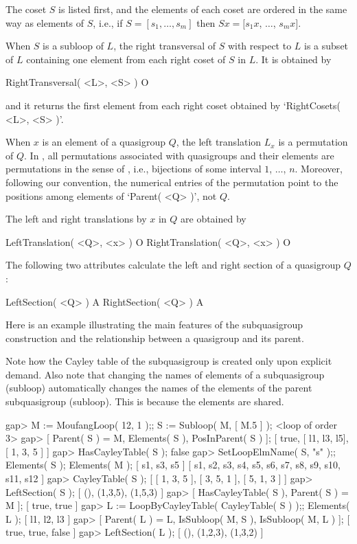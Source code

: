 The coset $S$ is listed first, and the elements of each coset are ordered in
the same way as elements of $S$, i.e., if $S = [s_1,\dots,s_m]$ then
$Sx=[s_1x$, $\dots$, $s_mx]$.

When $S$ is a subloop of $L$, the right transversal of $S$
with respect to $L$ is a subset of $L$ containing one element from each right
coset of $S$ in $L$. It is obtained by

\>RightTransversal( <L>, <S> ) O

and it returns the first element from each right coset obtained by
`RightCosets( <L>, <S> )'.


When $x$ is an element of a quasigroup $Q$, the left translation $L_x$ is a
permutation of $Q$. In {\LOOPS}, all permutations associated with quasigroups
and their elements are permutations in the sense of \GAP, i.e., bijections of
some interval $1$, $\dots$, $n$. Moreover, following our convention, the
numerical entries of the permutation point to the positions among elements of
`Parent( <Q> )', not $Q$.

The left and right translations by $x$ in $Q$ are obtained by

\>LeftTranslation( <Q>, <x> ) O
\>RightTranslation( <Q>, <x> ) O

The following two attributes calculate the left and right section of a
quasigroup $Q$:

\>LeftSection( <Q> ) A
\>RightSection( <Q> ) A

Here is an example illustrating the main features of the subquasigroup
construction and the relationship between a quasigroup and its parent.

Note how the Cayley table of the subquasigroup is created only upon explicit
demand. Also note that changing the names of elements of a subquasigroup
(subloop) automatically changes the names of the elements of the parent
subquasigroup (subloop). This is because the elements are shared.

\beginexample
gap> M := MoufangLoop( 12, 1 );; S := Subloop( M, [ M.5 ] );
<loop of order 3>
gap> [ Parent( S ) = M, Elements( S ), PosInParent( S ) ];
[ true, [ l1, l3, l5], [ 1, 3, 5 ] ]
gap> HasCayleyTable( S );
false
gap> SetLoopElmName( S, "s" );; Elements( S ); Elements( M );
[ s1, s3, s5 ]
[ s1, s2, s3, s4, s5, s6, s7, s8, s9, s10, s11, s12 ]
gap> CayleyTable( S );
[ [ 1, 3, 5 ], [ 3, 5, 1 ], [ 5, 1, 3 ] ]
gap> LeftSection( S );
[ (), (1,3,5), (1,5,3) ]
gap> [ HasCayleyTable( S ), Parent( S ) = M ];
[ true, true ]
gap> L := LoopByCayleyTable( CayleyTable( S ) );; Elements( L );
[ l1, l2, l3 ]
gap> [ Parent( L ) = L, IsSubloop( M, S ), IsSubloop( M, L ) ];
[ true, true, false ]
gap> LeftSection( L );
[ (), (1,2,3), (1,3,2) ]
\endexample

